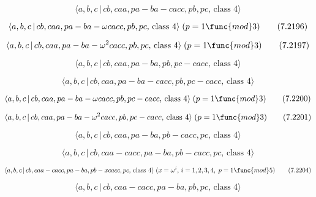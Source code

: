 \documentclass[10pt]{article}
\begin{document}
\begin{equation}
\langle a,b,c\,|\,cb,caa,pa-ba-cacc,pb,pc,\,\text{class }4\rangle 
\tag{7.2195}
\end{equation}

\begin{equation}
\langle a,b,c\,|\,cb,caa,pa-ba-\omega cacc,pb,pc,\,\text{class }4\rangle
\;(p=1\func{mod}3)  \tag{7.2196}
\end{equation}

\begin{equation}
\langle a,b,c\,|\,cb,caa,pa-ba-\omega ^{2}cacc,pb,pc,\,\text{class }4\rangle
\;(p=1\func{mod}3)  \tag{7.2197}
\end{equation}

\begin{equation}
\langle a,b,c\,|\,cb,caa,pa-ba,pb,pc-cacc,\,\text{class }4\rangle 
\tag{7.2198}
\end{equation}

\begin{equation}
\langle a,b,c\,|\,cb,caa,pa-ba-cacc,pb,pc-cacc,\,\text{class }4\rangle 
\tag{7.2199}
\end{equation}

\begin{equation}
\langle a,b,c\,|\,cb,caa,pa-ba-\omega cacc,pb,pc-cacc,\,\text{class }%
4\rangle \;(p=1\func{mod}3)  \tag{7.2200}
\end{equation}

\begin{equation}
\langle a,b,c\,|\,cb,caa,pa-ba-\omega ^{2}cacc,pb,pc-cacc,\,\text{class }%
4\rangle \;(p=1\func{mod}3)  \tag{7.2201}
\end{equation}

\begin{equation}
\langle a,b,c\,|\,cb,caa,pa-ba,pb-cacc,pc,\,\text{class }4\rangle 
\tag{7.2202}
\end{equation}

\begin{equation}
\langle a,b,c\,|\,cb,caa-cacc,pa-ba,pb-cacc,pc,\,\text{class }4\rangle 
\tag{7.2203}
\end{equation}

\begin{equation}
\langle a,b,c\,|\,cb,caa-cacc,pa-ba,pb-xcacc,pc,\,\text{class }4\rangle
\;(x=\omega ^{i},\,i=1,2,3,4,\;p=1\func{mod}5)  \tag{7.2204}
\end{equation}

\begin{equation}
\langle a,b,c\,|\,cb,caa-cacc,pa-ba,pb,pc,\,\text{class }4\rangle 
\tag{7.2205}
\end{equation}
\end{document}

